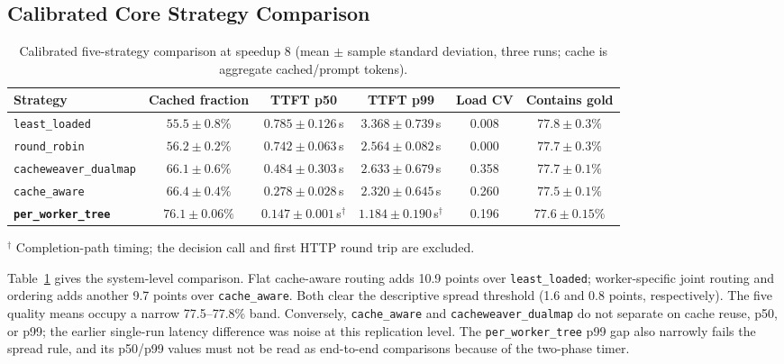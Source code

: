 \documentclass[conference]{IEEEtran}
\begin{document}
\subsection{Calibrated Core Strategy Comparison}

\begin{table}[t]
\caption{Calibrated five-strategy comparison at speedup 8 (mean $\pm$
sample standard deviation, three runs; cache is aggregate cached/prompt
tokens).}
\label{tab:core}
\centering
\small
\begin{tabular}{@{}lccccc@{}}
\toprule
\textbf{Strategy} & \textbf{Cached fraction} & \textbf{TTFT p50} &
\textbf{TTFT p99} & \textbf{Load CV} & \textbf{Contains gold} \\
\midrule
\texttt{least\_loaded} & $55.5{\pm}0.8\%$ & $0.785{\pm}0.126$\,s & $3.368{\pm}0.739$\,s & 0.008 & $77.8{\pm}0.3\%$ \\
\texttt{round\_robin} & $56.2{\pm}0.2\%$ & $0.742{\pm}0.063$\,s & $2.564{\pm}0.082$\,s & 0.000 & $77.7{\pm}0.3\%$ \\
\texttt{cacheweaver\_dualmap} & $66.1{\pm}0.6\%$ & $0.484{\pm}0.303$\,s & $2.633{\pm}0.679$\,s & 0.358 & $77.7{\pm}0.1\%$ \\
\texttt{cache\_aware} & $66.4{\pm}0.4\%$ & $0.278{\pm}0.028$\,s & $2.320{\pm}0.645$\,s & 0.260 & $77.5{\pm}0.1\%$ \\
\textbf{\texttt{per\_worker\_tree}} & $\mathbf{76.1{\pm}0.06\%}$ & $0.147{\pm}0.001$\,s$^\dagger$ & $1.184{\pm}0.190$\,s$^\dagger$ & 0.196 & $77.6{\pm}0.15\%$ \\
\bottomrule
\end{tabular}
\par\vspace{2pt}
{\footnotesize $^\dagger$ Completion-path timing; the decision call and first
HTTP round trip are excluded.\par}
\end{table}

Table~\ref{tab:core} gives the system-level comparison. Flat cache-aware routing adds 10.9 points over
\texttt{least\_loaded}; worker-specific joint routing and ordering adds
another 9.7 points over \texttt{cache\_aware}. Both clear the descriptive
spread threshold (1.6 and 0.8 points, respectively). The five quality
means occupy a narrow 77.5--77.8\% band. Conversely,
\texttt{cache\_aware} and \texttt{cacheweaver\_dualmap} do not separate
on cache reuse, p50, or p99; the earlier single-run latency difference
was noise at this replication level. The \texttt{per\_worker\_tree}
p99 gap also narrowly fails the spread rule, and its p50/p99 values must
not be read as end-to-end comparisons because of the two-phase timer.
\end{document}

